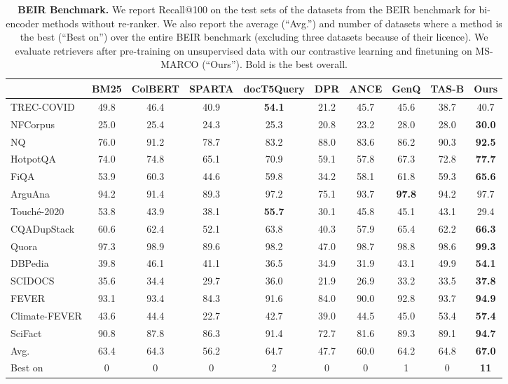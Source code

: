 \begin{table}[t!]
\centering
\small
\setlength{\tabcolsep}{5pt}
\begin{tabular}{@{}l  cc cc cc cc >{\columncolor{bluegrey}}c} 
 \toprule
 & BM25 & ColBERT &  SPARTA & docT5Query & DPR & ANCE & GenQ & TAS-B & Ours \\
 \midrule
    TREC-COVID & 49.8 & 46.4 & 40.9 & \bf 54.1 & 21.2 & 45.7 & 45.6 & 38.7 & 40.7 \\
    NFCorpus & 25.0 & 25.4 & 24.3 & 25.3 & 20.8 & 23.2 & 28.0 & 28.0 & \bf 30.0 \\
    NQ & 76.0 & 91.2 & 78.7 & 83.2 & 88.0 & 83.6 & 86.2 & 90.3 & \bf 92.5 \\
    HotpotQA & 74.0 & 74.8 & 65.1 & 70.9 & 59.1 & 57.8 & 67.3 & 72.8 & \bf 77.7 \\
    FiQA & 53.9 & 60.3 & 44.6 & 59.8 & 34.2 & 58.1 & 61.8 & 59.3 & \bf 65.6 \\
    ArguAna & 94.2 & 91.4 & 89.3 & 97.2 & 75.1 & 93.7 & \bf 97.8 & 94.2 & 97.7 \\
    Touch\'e-2020 & 53.8 & 43.9 & 38.1 & \bf 55.7 & 30.1 & 45.8 & 45.1 & 43.1 & 29.4 \\
    CQADupStack & 60.6 & 62.4 & 52.1 & 63.8 & 40.3 & 57.9 & 65.4 & 62.2 & \bf 66.3 \\
    Quora & 97.3 & 98.9 & 89.6 & 98.2 & 47.0 & 98.7 & 98.8 & 98.6 & \bf 99.3 \\
    DBPedia & 39.8 & 46.1 & 41.1 & 36.5 & 34.9 & 31.9 & 43.1 & 49.9 & \bf 54.1 \\
    SCIDOCS & 35.6 & 34.4 & 29.7 & 36.0 & 21.9 & 26.9 & 33.2 & 33.5 & \bf 37.8 \\
    FEVER & 93.1 & 93.4 & 84.3 & 91.6 & 84.0 & 90.0 & 92.8 & 93.7 & \bf 94.9 \\
    Climate-FEVER & 43.6 & 44.4 & 22.7 & 42.7 & 39.0 & 44.5 & 45.0 & 53.4 & \bf 57.4 \\
    SciFact & 90.8 & 87.8 & 86.3 & 91.4 & 72.7 & 81.6 & 89.3 & 89.1 & \bf 94.7 \\
 \midrule
 Avg. & 63.4 & 64.3 & 56.2 & 64.7 & 47.7 & 60.0 & 64.2 & 64.8 & \bf 67.0\\
 Best on  & 0 & 0 & 0 & 2 & 0 & 0 & 1 & 0 & \bf 11 \\
\bottomrule
\end{tabular}
\caption{\textbf{BEIR Benchmark.} 
  We report Recall@100 on the test sets of the datasets from the BEIR benchmark for bi-encoder methods without re-ranker.
  We also report the average (``Avg.'') and number of datasets where a method is the best (``Best on'') over the entire BEIR benchmark (excluding three datasets because of their licence).
  We evaluate retrievers after pre-training on unsupervised data with our contrastive learning and finetuning on MS-MARCO (``Ours'').
  Bold is the best overall.
}
\label{tab:beir_recall}
\end{table}

